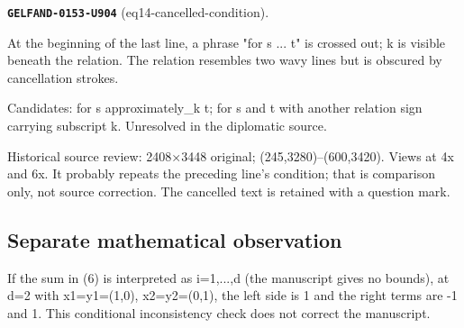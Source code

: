 \par\noindent\leavevmode{}\label{GELFAND-0153-U904}\textbf{\texttt{GELFAND-0153-U904}} (eq14-cancelled-condition).\nopagebreak[4]\par
At the beginning of the last line, a phrase "for s ... t" is crossed out; k is visible beneath the relation. The relation resembles two wavy lines but is obscured by cancellation strokes.\par
Candidates: for s approximately\_k t; for s and t with another relation sign carrying subscript k. Unresolved in the diplomatic source.\par
Historical source review: 2408×3448 original; (245,3280)–(600,3420). Views at 4x and 6x. It probably repeats the preceding line's condition; that is comparison only, not source correction. The cancelled text is retained with a question mark.\par\medskip
\subsection*{Separate mathematical observation}\label{GELFAND-P001412-EDITORIAL-MATH-01}
If the sum in (6) is interpreted as i=1,...,d (the manuscript gives no bounds), at d=2 with x1=y1=(1,0), x2=y2=(0,1), the left side is 1 and the right terms are -1 and 1. This conditional inconsistency check does not correct the manuscript.\par
